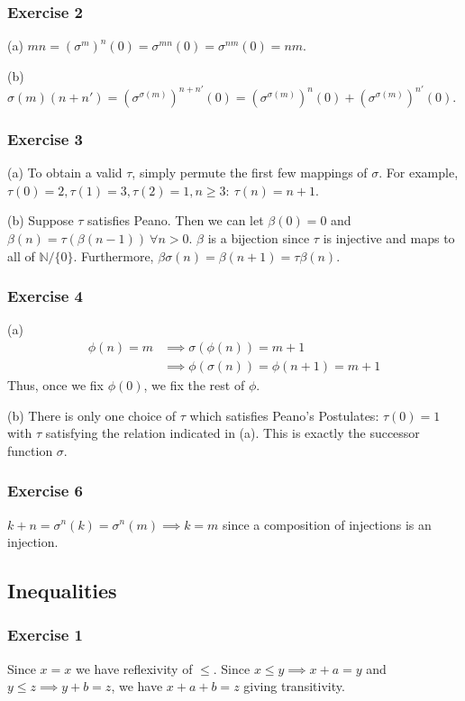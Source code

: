 \subsubsection{Exercise 2}
(a) $mn = (\sigma^m)^n (0) = \sigma^{mn} (0) = \sigma^{nm} (0) = nm$.

(b) $\sigma(m) (n + n') = (\sigma^{\sigma(m)})^{n + n'}(0) = (\sigma^{\sigma(m)})^n(0) + (\sigma^{\sigma(m)})^{n'}(0)$.

\subsubsection{Exercise 3}
(a) To obtain a valid $\tau$, simply permute the first few mappings of $\sigma$.
For example, $\tau(0) = 2, \tau(1) = 3, \tau(2) = 1, n \geq 3 : \: \tau(n) = n + 1$.

(b) Suppose $\tau$ satisfies Peano. Then we can let $\beta(0) = 0$ and 
$\beta(n) = \tau(\beta(n - 1))  \: \forall n > 0$. $\beta$ is a bijection since
$\tau$ is injective and maps to all of $\mathbb{N} / \{0\}$.
Furthermore, $\beta \sigma (n) = \beta (n+1) = \tau \beta (n)$.

\subsubsection{Exercise 4}
(a)
\begin{align*}
        \phi(n) = m &\implies \sigma(\phi(n)) = m + 1 \\
                    &\implies \phi(\sigma(n)) = \phi(n + 1) = m + 1
\end{align*}
Thus, once we fix $\phi(0)$, we fix the rest of $\phi$.

(b) There is only one choice of $\tau$ which satisfies Peano's Postulates:
$\tau(0) = 1$ with $\tau$ satisfying the relation indicated in (a). 
This is exactly the successor function $\sigma$.

\subsubsection{Exercise 6}
$k + n = \sigma^n(k) = \sigma^n(m) \implies k = m$ since a composition of injections
is an injection.

\subsection{Inequalities}

\subsubsection{Exercise 1}
Since  $x = x$ we have reflexivity of $\leq$.
Since $x \leq y \implies x + a = y$ and $y \leq z \implies y + b = z$,
we have $x + a + b = z$ giving transitivity.

